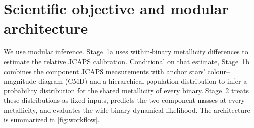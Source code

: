 \section{Scientific objective and modular architecture}
\label{sec:overview}

We use modular inference. Stage~1a uses
within-binary metallicity differences to estimate the relative JCAPS
calibration.  Conditional on that estimate, Stage~1b combines the component
JCAPS measurements with anchor stars' colour--magnitude diagram (CMD) and a
hierarchical population distribution to infer a probability distribution for
the shared metallicity of every binary.  Stage~2 treats these distributions as
fixed inputs, predicts the two component masses at every metallicity, and
evaluates the wide-binary dynamical likelihood. The architecture is summarized in
\cref{fig:workflow}.

